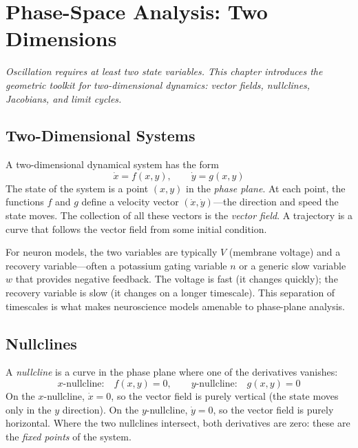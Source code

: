 \chapter{Phase-Space Analysis: Two Dimensions}
\label{ch:phase-plane-2d}

\textit{Oscillation requires at least two state variables. This chapter introduces the geometric toolkit for two-dimensional dynamics: vector fields, nullclines, Jacobians, and limit cycles.}

\section{Two-Dimensional Systems}
\label{sec:2d-systems}

A two-dimensional dynamical system has the form
%
\begin{equation}
  \dot{x} = f(x, y), \qquad \dot{y} = g(x, y)
  \label{eq:2d-system}
\end{equation}
%
The state of the system is a point $(x, y)$ in the \emph{phase plane}. At each point, the functions $f$ and $g$ define a velocity vector $(\dot{x}, \dot{y})$---the direction and speed the state moves. The collection of all these vectors is the \emph{vector field}. A trajectory is a curve that follows the vector field from some initial condition.

For neuron models, the two variables are typically $V$ (membrane voltage) and a recovery variable---often a potassium gating variable $n$ or a generic slow variable $w$ that provides negative feedback. The voltage is fast (it changes quickly); the recovery variable is slow (it changes on a longer timescale). This separation of timescales is what makes neuroscience models amenable to phase-plane analysis.

\section{Nullclines}
\label{sec:nullclines}

A \emph{nullcline} is a curve in the phase plane where one of the derivatives vanishes:
%
\begin{equation}
  \text{$x$-nullcline:}\quad f(x, y) = 0, \qquad
  \text{$y$-nullcline:}\quad g(x, y) = 0
  \label{eq:nullclines}
\end{equation}
%
On the $x$-nullcline, $\dot{x} = 0$, so the vector field is purely vertical (the state moves only in the $y$ direction). On the $y$-nullcline, $\dot{y} = 0$, so the vector field is purely horizontal. Where the two nullclines intersect, both derivatives are zero: these are the \emph{fixed points} of the system.

